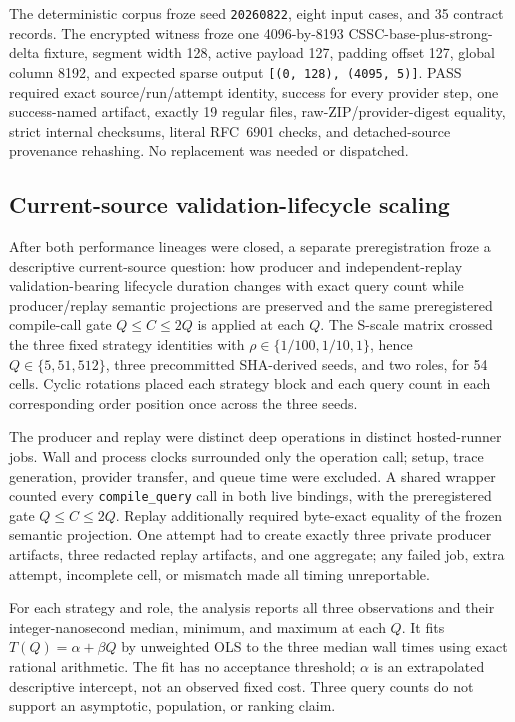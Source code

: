 The deterministic corpus froze seed \texttt{20260822}, eight input cases, and
35 contract records. The encrypted witness froze one 4096-by-8193
CSSC-base-plus-strong-delta fixture, segment width 128, active payload 127,
padding offset 127, global column 8192, and expected sparse output
\texttt{[(0, 128), (4095, 5)]}. PASS required exact source/run/attempt identity,
success for every provider step, one success-named artifact, exactly 19 regular
files, raw-ZIP/provider-digest equality, strict internal checksums, literal
RFC~6901 checks, and detached-source provenance rehashing. No replacement was
needed or dispatched.

\subsection{Current-source validation-lifecycle scaling}\label{current-source-validation-lifecycle-scaling}

After both performance lineages were closed, a separate preregistration froze
a descriptive current-source question: how producer and independent-replay
validation-bearing lifecycle duration changes with exact query count while
producer/replay semantic projections are preserved and the same preregistered
compile-call gate \(Q\leq C\leq2Q\) is applied at each \(Q\). The S-scale matrix crossed
the three fixed strategy identities with \(\rho\in\{1/100,1/10,1\}\), hence
\(Q\in\{5,51,512\}\), three precommitted SHA-derived seeds, and two roles, for
54 cells. Cyclic rotations placed each strategy block and each query count in
each corresponding order position once across the three seeds.

The producer and replay were distinct deep operations in distinct hosted-runner
jobs. Wall and process clocks surrounded only the operation call; setup, trace
generation, provider transfer, and queue time were excluded. A shared wrapper
counted every \texttt{compile\_query} call in both live bindings, with the
preregistered gate \(Q\leq C\leq2Q\). Replay additionally required byte-exact
equality of the frozen semantic projection. One attempt had to create exactly
three private producer artifacts, three redacted replay artifacts, and one
aggregate; any failed job, extra attempt, incomplete cell, or mismatch made all
timing unreportable.

For each strategy and role, the analysis reports all three observations and
their integer-nanosecond median, minimum, and maximum at each \(Q\). It fits
\(T(Q)=\alpha+\beta Q\) by unweighted OLS to the three median wall times using
exact rational arithmetic. The fit has no acceptance threshold; \(\alpha\) is
an extrapolated descriptive intercept, not an observed fixed cost. Three
query counts do not support an asymptotic, population, or ranking claim.


